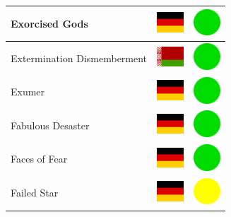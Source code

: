 \documentclass[12pt, a4paper, twoside]{report}
\begin{document}
\begin{center}
\begin{longtable}{|p{5cm}|p{2cm}|p{2cm}|}
 Exorcised Gods                                             & \includegraphics[width=1cm]{../img/flags/de} &   \includegraphics[width=1cm]{../likes/y} \\ \hline
 Extermination Dismemberment                                & \includegraphics[width=1cm]{../img/flags/by} &   \includegraphics[width=1cm]{../likes/y} \\ \hline
 Exumer                                                     & \includegraphics[width=1cm]{../img/flags/de} &   \includegraphics[width=1cm]{../likes/y} \\ \hline
 Fabulous Desaster                                          & \includegraphics[width=1cm]{../img/flags/de} &   \includegraphics[width=1cm]{../likes/y} \\ \hline
 Faces of Fear                                              & \includegraphics[width=1cm]{../img/flags/de} &   \includegraphics[width=1cm]{../likes/y} \\ \hline
 Failed Star                                                & \includegraphics[width=1cm]{../img/flags/de} &   \includegraphics[width=1cm]{../likes/m} \\ \hline

\end{longtable}
\end{center}
\end{document}
